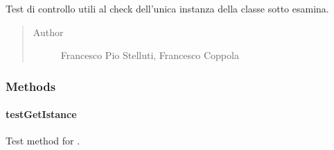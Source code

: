 \documentclass[letterpaper,10pt,italian]{sphinxmanual}
\begin{document}
\begin{fulllineitems}
\label{\detokenize{test/it/unicam/cs/pa/mastermind/test/UIConsoleStartViewTest:it.unicam.cs.pa.mastermind.test.UIConsoleStartViewTest}}
Test di controllo utili al check dell’unica instanza della classe sotto esamina.
\begin{quote}\begin{description}
\item[{Author}] \leavevmode
Francesco Pio Stelluti, Francesco Coppola

\end{description}\end{quote}

\end{fulllineitems}



\subsubsection{Methods}
\label{\detokenize{test/it/unicam/cs/pa/mastermind/test/UIConsoleStartViewTest:methods}}

\paragraph{testGetIstance}
\label{\detokenize{test/it/unicam/cs/pa/mastermind/test/UIConsoleStartViewTest:testgetistance}}

\begin{fulllineitems}
\label{\detokenize{test/it/unicam/cs/pa/mastermind/test/UIConsoleStartViewTest:it.unicam.cs.pa.mastermind.test.UIConsoleStartViewTest.testGetIstance()}}
Test method for {\hyperref[\detokenize{source/it/unicam/cs/pa/mastermind/ui/ConsoleStartView:it.unicam.cs.pa.mastermind.ui.ConsoleStartView.getInstance()}]{}}.

\end{fulllineitems}




\renewcommand{\indexname}{Indice}
\printindex
\end{document}
